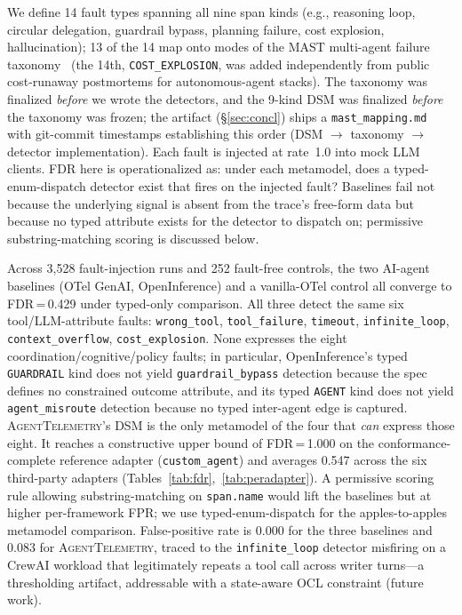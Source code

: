 \documentclass[sigconf,review]{acmart}
\begin{document}
We define 14 fault types spanning all nine span kinds (e.g., reasoning
loop, circular delegation, guardrail bypass, planning failure, cost
explosion, hallucination); 13 of the 14 map onto modes of the MAST
multi-agent failure taxonomy~\cite{cemri2025multiagent} (the 14th,
\texttt{COST\_EXPLOSION}, was added independently from public
cost-runaway postmortems for autonomous-agent stacks).  The
taxonomy was finalized \emph{before} we wrote the detectors, and the
9-kind DSM was finalized \emph{before} the taxonomy was frozen; the
artifact (\S\ref{sec:concl}) ships a \texttt{mast\_mapping.md} with
git-commit timestamps establishing this order (DSM
$\to$ taxonomy $\to$ detector implementation).
Each fault is injected at rate~1.0 into mock LLM clients.  FDR here
is operationalized as: under each metamodel, does a typed-enum-dispatch
detector exist that fires on the injected fault?  Baselines fail not
because the underlying signal is absent from the trace's free-form
data but because no typed attribute exists for the detector to
dispatch on; permissive substring-matching scoring is discussed below.

Across 3{,}528 fault-injection runs and 252 fault-free controls, the
two AI-agent baselines (OTel GenAI, OpenInference) and a vanilla-OTel
control all converge to FDR\,=\,0.429 under
typed-only comparison.  All three detect the same six tool/LLM-attribute
faults: \texttt{wrong\_tool}, \texttt{tool\_failure}, \texttt{timeout},
\texttt{infinite\_loop}, \texttt{context\_overflow}, \texttt{cost\_explosion}.
None expresses the eight coordination/cognitive/policy faults; in
particular, OpenInference's typed \texttt{GUARDRAIL} kind does not
yield \texttt{guardrail\_bypass} detection because the spec defines no
constrained outcome attribute, and its typed \texttt{AGENT} kind does
not yield \texttt{agent\_misroute} detection because no typed
inter-agent edge is captured.  \textsc{AgentTelemetry}'s DSM is the
only metamodel of the four that \emph{can} express those eight.  It
reaches a constructive upper bound of FDR\,=\,1.000 on the
conformance-complete reference adapter (\texttt{custom\_agent}) and
averages 0.547 across the six third-party adapters (Tables~\ref{tab:fdr},~\ref{tab:peradapter}).  A permissive scoring rule allowing substring-matching on \texttt{span.name} would lift the baselines but at higher per-framework FPR; we use typed-enum-dispatch for the apples-to-apples metamodel comparison.
False-positive rate is 0.000 for the three baselines and 0.083 for
\textsc{AgentTelemetry}, traced to the \texttt{infinite\_loop} detector
misfiring on a CrewAI workload that legitimately repeats a tool call
across writer turns---a thresholding artifact, addressable with a
state-aware OCL constraint (future work).
\end{document}
